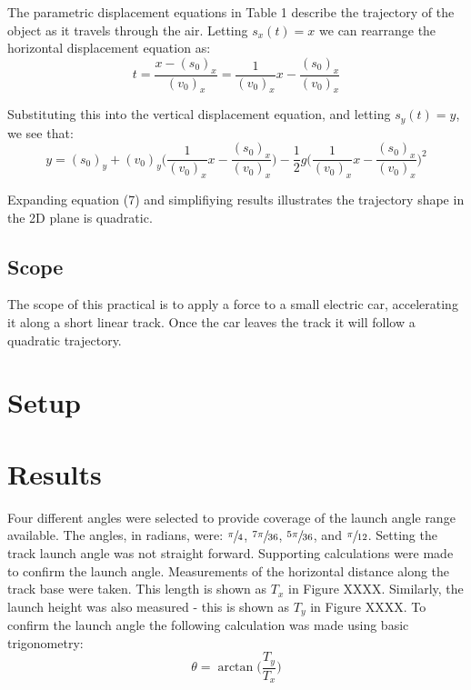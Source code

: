 \documentclass[a4paper]{article}
\begin{document}
The parametric displacement equations in Table 1 describe the trajectory of the object as it travels through the air. Letting $s_x(t) = x$ we can rearrange the horizontal displacement equation as:
\begin{equation}
t = \frac{x - (s_0)_x}{(v_0)_x} = \frac{1}{(v_0)_x}x - \frac{(s_0)_x}{(v_0)_x}
\end{equation}

Substituting this into the vertical displacement equation, and letting $s_y(t) = y$, we see that:
\begin{equation}
y = (s_0)_y + (v_0)_y \bigg(\frac{1}{(v_0)_x}x - \frac{(s_0)_x}{(v_0)_x} \bigg) -\frac{1}{2}g \bigg(\frac{1}{(v_0)_x}x - \frac{(s_0)_x}{(v_0)_x} \bigg)^2
\end{equation}

Expanding equation (7) and simplifiying results illustrates the trajectory shape in the 2D plane is quadratic.


\subsection{Scope}
The scope of this practical is to apply a force to a small electric car, accelerating it along a short linear track. Once the car leaves the track it will follow a quadratic trajectory.

\section{Setup}

\newpage

\section{Results}
Four different angles were selected to provide coverage of the launch angle range available. The angles, in radians, were: $\sfrac{\pi}{4}$, $\sfrac{7\pi}{36}$, $\sfrac{5\pi}{36}$, and $\sfrac{\pi}{12}$. Setting the track launch angle was not straight forward. Supporting calculations were made to confirm the launch angle. Measurements of the horizontal distance along the track base were taken. This length is shown as $T_x$ in Figure XXXX. Similarly, the launch height was also measured - this is shown as $T_y$ in Figure XXXX. To confirm the launch angle the following calculation was made using basic trigonometry:
\begin{equation}
\theta = \arctan\bigg(\frac{T_y}{T_x}\bigg)
\end{equation}
\end{document}
